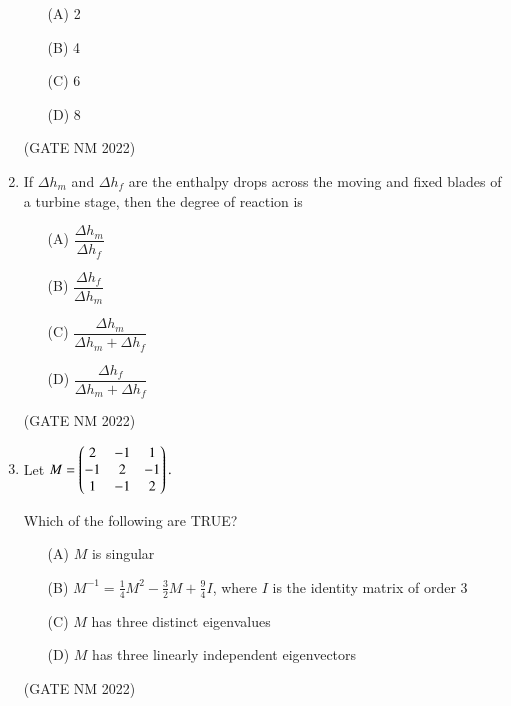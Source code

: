\documentclass[journal,12pt,onecolumn]{IEEEtran}
\theoremstyle{remark}
\begin{document}
\begin{enumerate}
\begin{enumerate}
    \item[(A)] 2
    \item[(B)] 4
    \item[(C)] 6
    \item[(D)] 8
\end{enumerate}

\hfill(GATE NM 2022)











\item  If $\Delta h_m$ and $\Delta h_f$ are the enthalpy drops across the moving and fixed blades of a turbine stage, then the degree of reaction is

\begin{enumerate}
    \item[(A)] $\dfrac{\Delta h_m}{ \Delta h_f}$
    \item[(B)] $\dfrac{\Delta h_f}{\Delta h_m }$
    \item[(C)] $\dfrac{\Delta h_m }{\Delta h_m + \Delta h_f}$
    \item[(D)] $\dfrac{\Delta h_f }{\Delta h_m + \Delta h_f}$
\end{enumerate}

\hfill(GATE NM 2022)



\item  Let  
$M=
\begin{pmatrix}2 & -1 & 1 \\
-1 & 2 & -1 \\
1 & -1 & 2\end{pmatrix}.
$  

Which of the following are TRUE?

\begin{enumerate}
    \item[(A)] $M$ is singular
    \item[(B)] $M^{-1} = {\frac{1}{4}}M^{2} - {\frac{3}{2}}M + {\frac{9}{4}}I $, where $I$ is the identity matrix of order 3
    \item[(C)] $M$ has three distinct eigenvalues
    \item[(D)] $M$ has three linearly independent eigenvectors
\end{enumerate}

\hfill(GATE NM 2022)













\end{enumerate}
\end{document}
